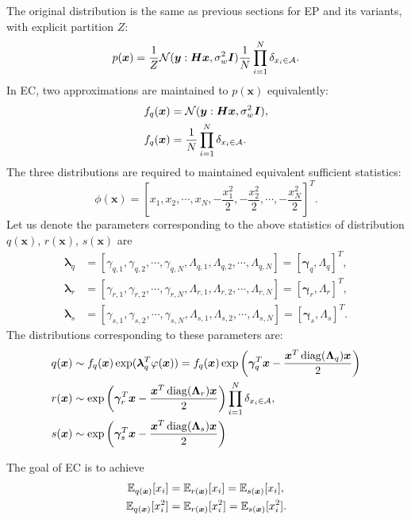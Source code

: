 \documentclass{article}
\DeclarePairedDelimiter{\diagfences}{(}{)}
\newcommand{\diag}{\operatorname{diag}\diagfences}
\begin{document}
The original distribution is the same as previous sections for EP and its variants, with explicit partition $Z$:
\begin{equation}
  p(\bm{x}) = \frac{1}{Z} \mathcal{N}(\bm{y}: \bm{H}\bm{x}, \sigma_{w}^2\bm{I}) \frac{1}{N}\prod_{i=1}^{N} \delta_{x_i \in \mathcal{A}}.
\end{equation}
In EC, two approximations are maintained to $p(\bm{x})$ equivalently:
\begin{align}
  f_q(\bm{x}) &= \mathcal{N}(\bm{y}: \bm{H}\bm{x}, \sigma^{2}_{w} \bm{I}), \\
  f_q(\bm{x}) &= \frac{1}{N} \prod_{i=1}^{N} \delta_{x_i \in \mathcal{A}}.
\end{align}
The three distributions are required to maintained equivalent sufficient statistics:
\begin{equation}
  \phi(\bm{x}) = \left[ x_1, x_2, \cdots, x_N, -\frac{x_1^2}{2}, -\frac{x_2^2}{2}, \cdots, -\frac{x_N^2}{2} \right]^{T}.
\end{equation}
Let us denote the parameters corresponding to the above statistics of distribution $q(\bm{x})$, $r(\bm{x})$, $s(\bm{x})$ are
\begin{align}
  \bm{\lambda}_q &= [\gamma_{q,1}, \gamma_{q,2}, \cdots, \gamma_{q,N}, \Lambda_{q,1}, \Lambda_{q,2}, \cdots, \Lambda_{q,N}] = [\bm{\gamma}_q, \Lambda_q]^{T}, \\
  \bm{\lambda}_r &= [\gamma_{r,1}, \gamma_{r,2}, \cdots, \gamma_{r,N}, \Lambda_{r,1}, \Lambda_{r,2}, \cdots, \Lambda_{r,N}] = [\bm{\gamma}_r, \Lambda_r]^{T}, \\
  \bm{\lambda}_s &= [\gamma_{s,1}, \gamma_{s,2}, \cdots, \gamma_{s,N}, \Lambda_{s,1}, \Lambda_{s,2}, \cdots, \Lambda_{s,N}] = [\bm{\gamma}_s, \Lambda_s]^{T}.
\end{align}
The distributions corresponding to these parameters are:
\begin{align}
  q(\bm{x}) &\sim f_q(\bm{x}) \exp(\bm{\lambda}_q^{T} \phi(\bm{x})) = f_q(\bm{x}) \exp\left( \bm{\gamma}_q^{T}\bm{x} - \frac{\bm{x}^{T}\diag{\bm{\Lambda}_q} \bm{x}}{2} \right) \\
  r(\bm{x}) &\sim \exp\left(  \bm{\gamma}_r^{T}\bm{x} - \frac{\bm{x}^{T}\diag{\bm{\Lambda}_r} \bm{x}}{2} \right) \prod_{i=1}^{N} \delta_{x_i\in\Aa}, \\
  s(\bm{x}) &\sim \exp\left(  \bm{\gamma}_s^{T}\bm{x} - \frac{\bm{x}^{T}\diag{\bm{\Lambda}_s} \bm{x}}{2} \right)
\end{align}


The goal of EC is to achieve
\begin{align}
  \mathbb{E}_{q(\bm{x})}[x_i] &= \mathbb{E}_{r(\bm{x})}[x_i] = \mathbb{E}_{s(\bm{x})}[x_i], \\
  \mathbb{E}_{q(\bm{x})}[x_i^2] &= \mathbb{E}_{r(\bm{x})}[x_i^2] = \mathbb{E}_{s(\bm{x})}[x_i^2].
\end{align}
\end{document}
